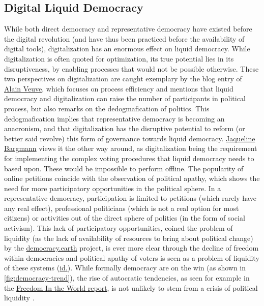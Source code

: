 \subsection{Digital Liquid Democracy}
\label{ssec:Digital_LD}
While both direct democracy and representative democracy have existed before the digital revolution (and have thus been practiced before the availability of digital tools), digitalization has an enormous effect on liquid democracy. While digitalization is often quoted for optimization, its true potential lies in its disruptiveness, by enabling processes that would not be possible otherwise. These two perspectives on digitalization are caught exemplary by the blog entry of \href{https://www.aoe.com/en/blog/digital-politics-how-digitalization-will-change-the-political-process.html}{Alain Veuve}, which focuses on process efficiency and mentions that liquid democracy and digitalization can raise the number of participants in political process, but also remarks on the dedogmafication of politics. This dedogmafication implies that representative democracy is becoming an anacronism, and that digitalization has the disruptive potential to reform (or better said revolve) this form of governance towards liquid democracy. 
\href{https://www.polyas.de/blog/en/digital-democracy/liquid-democracy-2}{Jaqueline Bargmann} views it the other way around, as digitalization being the requirement for implementing the complex voting procedures that liquid democracy needs to based upon. These would be impossible to perform offline. 
The popularity of online petitions coincide with the observation of political apathy, which shows the need for more participatory opportunities in the political sphere. In a representative democracy, participation is limited to petitions (which rarely have any real effect), professional politicians (which is not a real option for most citizens) or activities out of the direct sphere of politics (in the form of social activism). This lack of participatory opportunities, coined the problem of liquidity (as the lack of availability of resources to bring about political change) by the \href{https://www.democracy.earth/}{democracy.earth} project, is ever more clear through the decline of freedom within democracies and political apathy of voters is seen as a problem of liquidity of these systems (\href{https://govfresh.com/2019/01/liquid-democracy-blockchains-and-governance-in-the-post-nation-state-era/}{id.}). While formally democracy are on the win (as shown in \ref{fig:democracy-trend}), the rise of autocratic tendencies, as seen for example in the \href{https://freedomhouse.org/report/freedom-world/freedom-world-2019/democracy-in-retreat}{Freedom In the World report}, is not unlikely to stem from a crisis of political liquidity .

